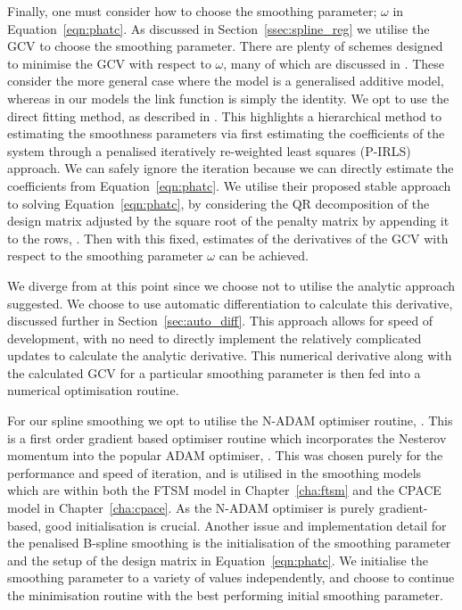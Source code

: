 Finally, one must consider how to choose the smoothing parameter; $\omega$ in Equation~\eqref{eqn:phatc}.
As discussed in Section~\ref{ssec:spline_reg} we utilise the GCV to choose the smoothing parameter.
There are plenty of schemes designed to minimise the GCV with respect to $\omega$, many of which are discussed in \citep{wood_fast_2011}.
These consider the more general case where the model is a generalised additive model, whereas in our models the link function is simply the identity.
We opt to use the direct fitting method, as described in \citep{wood_fast_2008}.
This highlights a hierarchical method to estimating the smoothness parameters via first estimating the coefficients of the system through a penalised iteratively re-weighted least squares (P-IRLS) approach.
We can safely ignore the iteration because we can directly estimate the coefficients from Equation~\eqref{eqn:phatc}.
We utilise their proposed stable approach to solving Equation~\eqref{eqn:phatc}, by considering the QR decomposition of the design matrix adjusted by the square root of the penalty matrix by appending it to the rows, \citep{wood_fast_2008}.
Then with this fixed, estimates of the derivatives of the GCV with respect to the smoothing parameter $\omega$ can be achieved.

We diverge from \citep{wood_fast_2008} at this point since we choose not to utilise the analytic approach suggested.
We choose to use automatic differentiation to calculate this derivative, discussed further in Section~\ref{sec:auto_diff}.
This approach allows for speed of development, with no need to directly implement the relatively complicated updates to calculate the analytic derivative.
This numerical derivative along with the calculated GCV for a particular smoothing parameter is then fed into a numerical optimisation routine.

For our spline smoothing we opt to utilise the N-ADAM optimiser routine, \citep{dozat_incorporating_2016}.
This is a first order gradient based optimiser routine which incorporates the Nesterov momentum into the popular ADAM optimiser, \citep{dozat_incorporating_2016}.
This was chosen purely for the performance and speed of iteration, and is utilised in the smoothing models which are within both the FTSM model in Chapter~\ref{cha:ftsm} and the CPACE model in Chapter~\ref{cha:cpace}.
As the N-ADAM optimiser is purely gradient-based, good initialisation is crucial.
Another issue and implementation detail for the penalised B-spline smoothing is the initialisation of the smoothing parameter and the setup of the design matrix in Equation~\eqref{eqn:phatc}.
We initialise the smoothing parameter to a variety of values independently, and choose to continue the minimisation routine with the best performing initial smoothing parameter.

